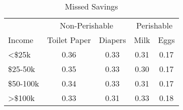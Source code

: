 \begin{table}[!htbp] \centering
  \caption{Missed Savings}
\begin{tabular}{lcccc}
\hline
            & \multicolumn{2}{c}{Non-Perishable} & \multicolumn{2}{c}{Perishable} \\
              \cline{2-3}                             \cline{4-5}
Income      & Toilet Paper  & Diapers & Milk  & Eggs \\
\hline
<\$25k      & 0.36          & 0.33    & 0.31  & 0.17 \\
\$25-50k    & 0.35          & 0.33    & 0.30  & 0.17 \\
\$50-100k   & 0.34          & 0.33    & 0.31  & 0.17 \\
>\$100k     & 0.33          & 0.31    & 0.33  & 0.18  \\
\hline
\hline
\end{tabular}
\end{table}
